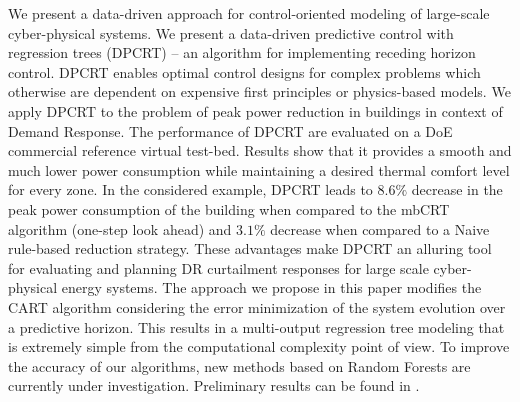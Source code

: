 We present a data-driven approach for control-oriented modeling of large-scale cyber-physical systems. 
We present a data-driven predictive control with regression trees (DPCRT) -- an algorithm for implementing receding horizon control. 
DPCRT enables optimal control designs for complex problems which otherwise are dependent on expensive first principles or physics-based models. 
We apply DPCRT to the problem of peak power reduction in buildings in context of Demand Response. 
The performance of DPCRT are evaluated on a DoE commercial reference virtual test-bed. 
Results show that it provides a smooth and much lower power consumption while maintaining a desired thermal comfort level for every zone.
In the considered example, DPCRT leads to $8.6\%$ decrease in the peak power consumption of the building when compared to the mbCRT algorithm (one-step look ahead) and $3.1\%$ decrease when compared to a Naive rule-based reduction strategy. 
These advantages make DPCRT an alluring tool for evaluating and planning DR curtailment responses for large scale cyber-physical energy systems.
The approach we propose in this paper modifies the CART algorithm considering the error minimization of the system evolution over a predictive horizon. 
This results in a multi-output regression tree modeling that is extremely simple from the computational complexity point of view. 
To improve the accuracy of our algorithms, new methods based on Random Forests are currently under investigation. Preliminary results can be found in \cite{JainACC2017,JainCDC2017}.
